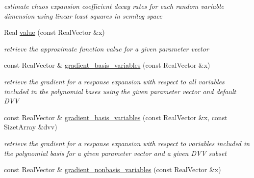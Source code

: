 \begin{DoxyCompactItemize}
\begin{DoxyCompactList}\small\item\em estimate chaos expansion coefficient decay rates for each random variable dimension using linear least squares in semilog space \end{DoxyCompactList}\item 
Real \hyperlink{classPecos_1_1RegressOrthogPolyApproximation_a7bc9dcdf32fc46f97e286268c1ac51b0}{value} (const Real\+Vector \&x)\label{classPecos_1_1RegressOrthogPolyApproximation_a7bc9dcdf32fc46f97e286268c1ac51b0}

\begin{DoxyCompactList}\small\item\em retrieve the approximate function value for a given parameter vector \end{DoxyCompactList}\item 
const Real\+Vector \& \hyperlink{classPecos_1_1RegressOrthogPolyApproximation_ae3b6ea541392b74cf0cc8758e206277c}{gradient\+\_\+basis\+\_\+variables} (const Real\+Vector \&x)\label{classPecos_1_1RegressOrthogPolyApproximation_ae3b6ea541392b74cf0cc8758e206277c}

\begin{DoxyCompactList}\small\item\em retrieve the gradient for a response expansion with respect to all variables included in the polynomial bases using the given parameter vector and default D\+VV \end{DoxyCompactList}\item 
const Real\+Vector \& \hyperlink{classPecos_1_1RegressOrthogPolyApproximation_a3ffb563ae1658344bfc2ad882def9e7c}{gradient\+\_\+basis\+\_\+variables} (const Real\+Vector \&x, const Sizet\+Array \&dvv)\label{classPecos_1_1RegressOrthogPolyApproximation_a3ffb563ae1658344bfc2ad882def9e7c}

\begin{DoxyCompactList}\small\item\em retrieve the gradient for a response expansion with respect to variables included in the polynomial basis for a given parameter vector and a given D\+VV subset \end{DoxyCompactList}\item 
const Real\+Vector \& \hyperlink{classPecos_1_1RegressOrthogPolyApproximation_a518e8604f973a4b161a9b5718a0aa25e}{gradient\+\_\+nonbasis\+\_\+variables} (const Real\+Vector \&x)\label{classPecos_1_1RegressOrthogPolyApproximation_a518e8604f973a4b161a9b5718a0aa25e}


\end{DoxyCompactItemize}
